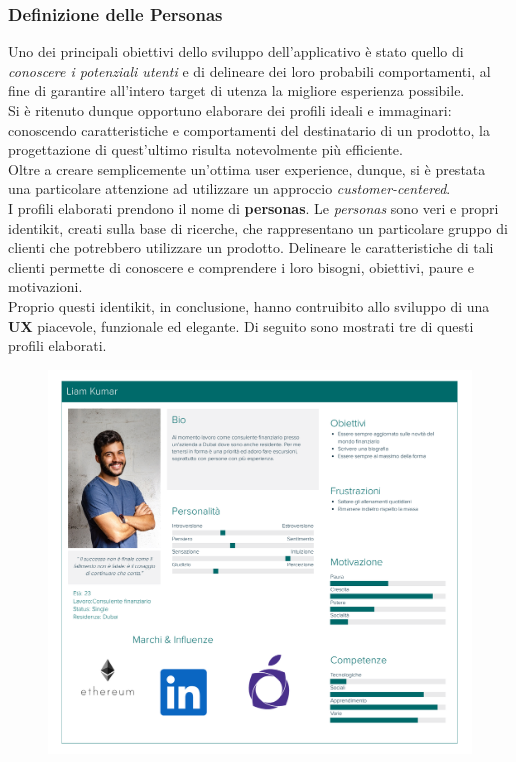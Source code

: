 \documentclass{natourDoc}
\begin{document}
\subsubsection{Definizione delle Personas}
Uno dei principali obiettivi dello sviluppo dell'applicativo è stato quello di \textit{conoscere i potenziali utenti}
e di delineare dei loro probabili comportamenti, al fine di garantire all'intero target di utenza la migliore esperienza
possibile. \\
Si è ritenuto dunque opportuno elaborare dei profili ideali e immaginari: conoscendo caratteristiche e comportamenti del destinatario
di un prodotto, la progettazione di quest'ultimo risulta notevolmente più efficiente. \\
Oltre a creare semplicemente un'ottima user experience, dunque, si è prestata una particolare attenzione ad utilizzare un approccio \textit{customer-centered}. \\
I profili elaborati prendono il nome di \textbf{personas}. Le \textit{personas} sono veri e propri identikit, creati sulla base di ricerche, che rappresentano un particolare
gruppo di clienti che potrebbero utilizzare un prodotto. Delineare le caratteristiche di tali clienti permette di conoscere e comprendere i
loro bisogni, obiettivi, paure e motivazioni.\\
Proprio questi identikit, in conclusione, hanno contruibito allo sviluppo di una \textbf{UX} piacevole, funzionale ed elegante. Di seguito sono mostrati tre di questi profili elaborati. \\

\begin{figure}[!htbp]
	\centering
	\includegraphics[width=\textwidth]{./personas/personas-kumar.pdf}
\end{figure}
\end{document}
